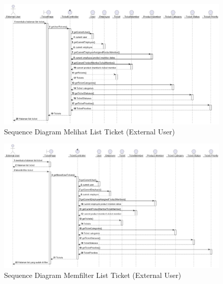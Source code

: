 \documentclass[12pt]{article}
\begin{document}
\begin{enumerate}[label=\textbf{4.\arabic*.}]
\begin{enumerate} [label=\textbf{4.2.\arabic*.}, wide, labelwidth=!, labelindent=0pt]
\begin{enumerate}[label=\textbf{4.2.2.\arabic*.}, wide, labelwidth=!, labelindent=0pt]
\begin{enumerate}[label=\arabic*.]
                \begin{figure}
                    \centering \includegraphics[height=0.575\textheight]{out/plantuml/sequence/ex/ex1/Melihat List Ticket.png}
                    \caption{Sequence Diagram Melihat List Ticket (External User)}
                    \label{fig:SQ-PIC-01}
                \end{figure}

                \begin{figure}
                    \centering \includegraphics[height=0.575\textheight]{out/plantuml/sequence/ex/ex2/Memfilter List Ticket.png}
                    \caption{Sequence Diagram Memfilter List Ticket (External User)}
                    \label{fig:SQ-PIC-02}
                \end{figure}


\end{enumerate}
\end{enumerate}
\end{enumerate}
\end{enumerate}
\end{document}
